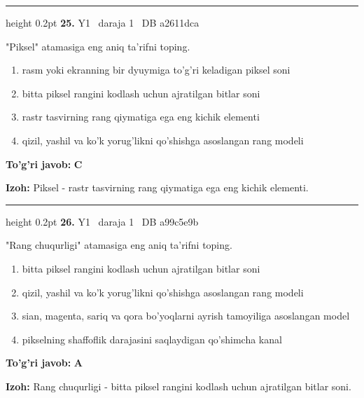 \documentclass[10pt,a4paper,oneside]{article}
\begin{document}
\vspace{2mm}\hrule height 0.2pt \vspace{4mm}
\hypertarget{q25}{\textbf{\color{ink}25.}}  {\color{muted}\scriptsize Y1 \textbullet\ daraja 1 \textbullet\ DB a2611dca}
\par
"Piksel" atamasiga eng aniq ta'rifni toping.
\begin{enumerate}[label=\Alph*),leftmargin=9mm]
\item rasm yoki ekranning bir dyuymiga to'g'ri keladigan piksel soni
\item bitta piksel rangini kodlash uchun ajratilgan bitlar soni
\item rastr tasvirning rang qiymatiga ega eng kichik elementi
\item qizil, yashil va ko'k yorug'likni qo'shishga asoslangan rang modeli
\end{enumerate}
\begin{tcolorbox}[enhanced,breakable,colback=teal!4,colframe=teal!45!black,boxrule=0.45pt,arc=1.2mm,left=2.8mm,right=2.8mm,top=2mm,bottom=2mm,before skip=2mm,after skip=2mm]
\textbf{\color{teal}To'g'ri javob:} \textbf{C}
\par\smallskip
\textbf{Izoh:} Piksel - rastr tasvirning rang qiymatiga ega eng kichik elementi.
\end{tcolorbox}
\vspace{2mm}\hrule height 0.2pt \vspace{4mm}
\hypertarget{q26}{\textbf{\color{ink}26.}}  {\color{muted}\scriptsize Y1 \textbullet\ daraja 1 \textbullet\ DB a99c5e9b}
\par
"Rang chuqurligi" atamasiga eng aniq ta'rifni toping.
\begin{enumerate}[label=\Alph*),leftmargin=9mm]
\item bitta piksel rangini kodlash uchun ajratilgan bitlar soni
\item qizil, yashil va ko'k yorug'likni qo'shishga asoslangan rang modeli
\item sian, magenta, sariq va qora bo'yoqlarni ayrish tamoyiliga asoslangan model
\item pikselning shaffoflik darajasini saqlaydigan qo'shimcha kanal
\end{enumerate}
\begin{tcolorbox}[enhanced,breakable,colback=teal!4,colframe=teal!45!black,boxrule=0.45pt,arc=1.2mm,left=2.8mm,right=2.8mm,top=2mm,bottom=2mm,before skip=2mm,after skip=2mm]
\textbf{\color{teal}To'g'ri javob:} \textbf{A}
\par\smallskip
\textbf{Izoh:} Rang chuqurligi - bitta piksel rangini kodlash uchun ajratilgan bitlar soni.
\end{tcolorbox}
\end{document}
